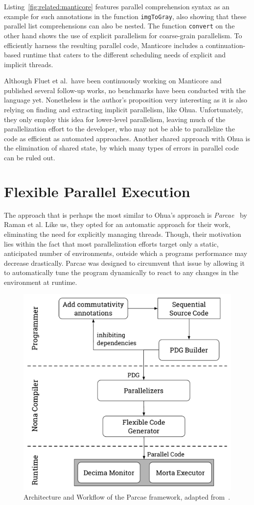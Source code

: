Listing~\ref{fig:related:manticore} features parallel comprehension syntax as an example for such annotations in the function \texttt{imgToGray}, also showing that these parallel list comprehensions can also be nested.
The function \texttt{convert} on the other hand shows the use of explicit parallelism for coarse-grain parallelism.
To efficiently harness the resulting parallel code, Manticore includes a continuation-based runtime that caters to the different scheduling needs of explicit and implicit threads.

Although Fluet et al.\ have been continuously working on Manticore and published several follow-up works, no benchmarks have been conducted with the language yet.
Nonetheless is the author's proposition very interesting as it is also relying on finding and extracting implicit parallelism, like Ohua.
Unfortunately, they only employ this idea for lower-level parallelism, leaving much of the parallelization effort to the developer, who may not be able to parallelize the code as efficient as automated approaches.
Another shared approach with Ohua is the elimination of shared state, by which many types of errors in parallel code can be ruled out.


\section{Flexible Parallel Execution}%
\label{sec:related:parcae}
The approach that is perhaps the most similar to Ohua's approach is \emph{Parcae}~\cite{raman2012parcae} by Raman et al.
Like us, they opted for an automatic approach for their work, eliminating the need for explicitly managing threads.
Though, their motivation lies within the fact that most parallelization efforts target only a static, anticipated number of environments, outside which a programs performance may decrease drastically.
Parcae was designed to circumvent that issue by allowing it to automatically tune the program dynamically to react to any changes in the environment at runtime.

\begin{figure}[h]
    \centering
    \includegraphics[width=.6\textwidth,keepaspectratio]{gfx/related/parcae}
    \caption{Architecture and Workflow of the Parcae framework, adapted from~\cite{raman2012parcae}.}%
    \label{fig:related:parcae}
\end{figure}

